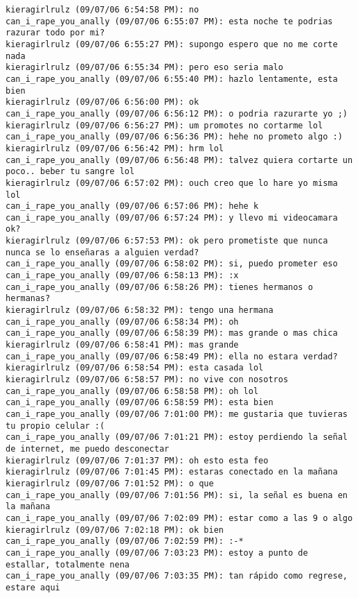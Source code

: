 \begin{verbatim}
kieragirlrulz (09/07/06 6:54:58 PM): no
can_i_rape_you_anally (09/07/06 6:55:07 PM): esta noche te podrias razurar todo por mi?
kieragirlrulz (09/07/06 6:55:27 PM): supongo espero que no me corte nada
kieragirlrulz (09/07/06 6:55:34 PM): pero eso seria malo
can_i_rape_you_anally (09/07/06 6:55:40 PM): hazlo lentamente, esta bien
kieragirlrulz (09/07/06 6:56:00 PM): ok
can_i_rape_you_anally (09/07/06 6:56:12 PM): o podria razurarte yo ;)
kieragirlrulz (09/07/06 6:56:27 PM): um promotes no cortarme lol
can_i_rape_you_anally (09/07/06 6:56:36 PM): hehe no prometo algo :)
kieragirlrulz (09/07/06 6:56:42 PM): hrm lol
can_i_rape_you_anally (09/07/06 6:56:48 PM): talvez quiera cortarte un poco.. beber tu sangre lol
kieragirlrulz (09/07/06 6:57:02 PM): ouch creo que lo hare yo misma lol
can_i_rape_you_anally (09/07/06 6:57:06 PM): hehe k
can_i_rape_you_anally (09/07/06 6:57:24 PM): y llevo mi videocamara ok?
kieragirlrulz (09/07/06 6:57:53 PM): ok pero prometiste que nunca nunca se lo enseñaras a alguien verdad? 
can_i_rape_you_anally (09/07/06 6:58:02 PM): si, puedo prometer eso
can_i_rape_you_anally (09/07/06 6:58:13 PM): :x
can_i_rape_you_anally (09/07/06 6:58:26 PM): tienes hermanos o hermanas?
kieragirlrulz (09/07/06 6:58:32 PM): tengo una hermana
can_i_rape_you_anally (09/07/06 6:58:34 PM): oh
can_i_rape_you_anally (09/07/06 6:58:39 PM): mas grande o mas chica
kieragirlrulz (09/07/06 6:58:41 PM): mas grande
can_i_rape_you_anally (09/07/06 6:58:49 PM): ella no estara verdad?
kieragirlrulz (09/07/06 6:58:54 PM): esta casada lol
kieragirlrulz (09/07/06 6:58:57 PM): no vive con nosotros
can_i_rape_you_anally (09/07/06 6:58:58 PM): oh lol
can_i_rape_you_anally (09/07/06 6:58:59 PM): esta bien
can_i_rape_you_anally (09/07/06 7:01:00 PM): me gustaria que tuvieras tu propio celular :(
can_i_rape_you_anally (09/07/06 7:01:21 PM): estoy perdiendo la señal de internet, me puedo desconectar
kieragirlrulz (09/07/06 7:01:37 PM): oh esto esta feo
kieragirlrulz (09/07/06 7:01:45 PM): estaras conectado en la mañana
kieragirlrulz (09/07/06 7:01:52 PM): o que
can_i_rape_you_anally (09/07/06 7:01:56 PM): si, la señal es buena en la mañana
can_i_rape_you_anally (09/07/06 7:02:09 PM): estar como a las 9 o algo
kieragirlrulz (09/07/06 7:02:18 PM): ok bien
can_i_rape_you_anally (09/07/06 7:02:59 PM): :-*
can_i_rape_you_anally (09/07/06 7:03:23 PM): estoy a punto de estallar, totalmente nena 
can_i_rape_you_anally (09/07/06 7:03:35 PM): tan rápido como regrese, estare aqui

\end{verbatim}